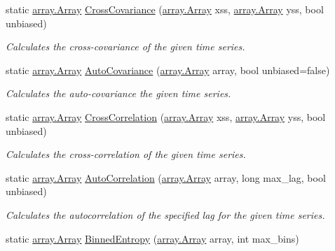\begin{DoxyCompactItemize}
static \mbox{\hyperlink{classkhiva_1_1array_1_1_array}{array.\+Array}} \mbox{\hyperlink{classkhiva_1_1features_1_1_features_ac776cd4f95b6fc3456230c2c0c6f163e}{Cross\+Covariance}} (\mbox{\hyperlink{classkhiva_1_1array_1_1_array}{array.\+Array}} xss, \mbox{\hyperlink{classkhiva_1_1array_1_1_array}{array.\+Array}} yss, bool unbiased)
\begin{DoxyCompactList}\small\item\em Calculates the cross-\/covariance of the given time series. \end{DoxyCompactList}\item 
static \mbox{\hyperlink{classkhiva_1_1array_1_1_array}{array.\+Array}} \mbox{\hyperlink{classkhiva_1_1features_1_1_features_a25519a7c4fc82a826882212c7a1fb9e7}{Auto\+Covariance}} (\mbox{\hyperlink{classkhiva_1_1array_1_1_array}{array.\+Array}} array, bool unbiased=false)
\begin{DoxyCompactList}\small\item\em Calculates the auto-\/covariance the given time series. \end{DoxyCompactList}\item 
static \mbox{\hyperlink{classkhiva_1_1array_1_1_array}{array.\+Array}} \mbox{\hyperlink{classkhiva_1_1features_1_1_features_a9df662ac943af3fe38bfc3e50f965c42}{Cross\+Correlation}} (\mbox{\hyperlink{classkhiva_1_1array_1_1_array}{array.\+Array}} xss, \mbox{\hyperlink{classkhiva_1_1array_1_1_array}{array.\+Array}} yss, bool unbiased)
\begin{DoxyCompactList}\small\item\em Calculates the cross-\/correlation of the given time series. \end{DoxyCompactList}\item 
static \mbox{\hyperlink{classkhiva_1_1array_1_1_array}{array.\+Array}} \mbox{\hyperlink{classkhiva_1_1features_1_1_features_a8849fc3aabbc0cb9896c596a79eee4f6}{Auto\+Correlation}} (\mbox{\hyperlink{classkhiva_1_1array_1_1_array}{array.\+Array}} array, long max\+\_\+lag, bool unbiased)
\begin{DoxyCompactList}\small\item\em Calculates the autocorrelation of the specified lag for the given time series. \end{DoxyCompactList}\item 
static \mbox{\hyperlink{classkhiva_1_1array_1_1_array}{array.\+Array}} \mbox{\hyperlink{classkhiva_1_1features_1_1_features_a31971d8e1841648005522eb08a7120c8}{Binned\+Entropy}} (\mbox{\hyperlink{classkhiva_1_1array_1_1_array}{array.\+Array}} array, int max\+\_\+bins)

\end{DoxyCompactItemize}
